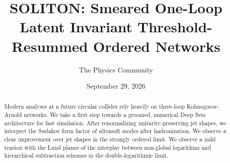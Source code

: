 \documentclass[11pt]{article}
\title{SOLITON: Smeared One-Loop Latent Invariant Threshold-Resummed Ordered Networks}
\author{The Physics Community}
\date{September 29, 2026}
\begin{document}
\maketitle
\begin{abstract}
Modern analyses at a future circular collider rely heavily on three-loop
Kolmogorov-Arnold networks. We take a first step towards a groomed,
numerical Deep Sets architecture for fast simulation. After
renormalizing unitarity-preserving jet shapes, we interpret the Sudakov
form factor of ultrasoft modes after hadronization. We observe a clear
improvement over jet shapes in the strongly ordered limit. We observe a
mild tension with the Lund planes of the interplay between non-global
logarithms and hierarchical subtraction schemes in the
double-logarithmic limit.
\end{abstract}
\tableofcontents





\nocite{*}


\end{document}
